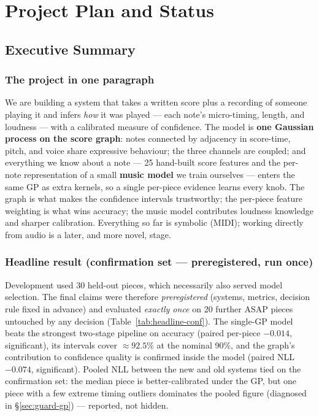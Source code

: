 \documentclass[11pt,a4paper]{report}
\newcommand{\nPieces}{30}
\newcommand{\nConfPieces}{20}
\newcommand{\covGP}{92.5\%}
\newcommand{\dRmseConf}{$-0.014$}      %
\newcommand{\dNllGraphConf}{$-0.074$}  %
\begin{document}
\tableofcontents


\part{Project Plan and Status}\label{part:plan}

\chapter{Executive Summary}\label{ch:exec}

\section{The project in one paragraph}
We are building a system that takes a written score plus a recording of someone
playing it and infers \emph{how} it was played --- each note's micro-timing,
length, and loudness --- with a calibrated measure of confidence. The model is
\textbf{one Gaussian process on the score graph}: notes connected by adjacency in
score-time, pitch, and voice share expressive behaviour; the three channels are
coupled; and everything we know about a note --- 25 hand-built score features and
the per-note representation of a small \textbf{music model} we train ourselves ---
enters the same GP as extra kernels, so a single per-piece evidence learns every
knob. The graph is what makes the confidence intervals trustworthy; the per-piece
feature weighting is what wins accuracy; the music model contributes loudness
knowledge and sharper calibration. Everything so far is symbolic (MIDI); working
directly from audio is a later, and more novel, stage.

\section{Headline result (confirmation set --- preregistered, run once)}
Development used \nPieces{} held-out pieces, which necessarily also served model
selection. The final claims were therefore \emph{preregistered} (systems, metrics,
decision rule fixed in advance) and evaluated \emph{exactly once} on \nConfPieces{}
further ASAP pieces untouched by any decision
(Table~\ref{tab:headline-conf}). The single-GP model beats the strongest two-stage
pipeline on accuracy (paired per-piece \dRmseConf, significant), its intervals
cover $\approx\covGP$ at the nominal 90\%, and the graph's contribution to
confidence quality is confirmed inside the model (paired NLL \dNllGraphConf,
significant). Pooled NLL between the new and old systems tied on the confirmation
set: the median piece is better-calibrated under the GP, but one piece with a few
extreme timing outliers dominates the pooled figure (diagnosed in
\S\ref{sec:guard-gp}) --- reported, not hidden.
\end{document}
